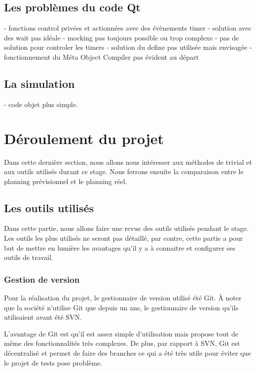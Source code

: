 \documentclass[a4paper]{article}
\begin{document}
\subsection{Les problèmes du code Qt}

- fonctions control privées et actionnées avec des évènements timer
- solution avec des wait pas idéale
- mocking pas toujours possible ou trop complexe
- pas de solution pour controler les timers
- solution du define pas utilisée mais envisagée
- fonctionnement du Méta Object Compiler pas évident au départ

\subsection{La simulation}

- code objet plus simple.
\section{Déroulement du projet}%

Dans cette dernière section, nous allons nous intéresser aux méthodes de
trivial et aux outils utilisés durant ce stage. Nous ferrons ensuite la
comparaison entre le planning prévisionnel et le planning réel.

\subsection{Les outils utilisés}%

Dans cette partie, nous allons faire une revue des outils utilisés pendant le
stage. Les outils les plus utilisés ne seront pas détaillé, par contre, cette
partie a pour but de mettre en lumière les avantages qu'il y a à connaitre et
configurer ses outils de travail.

\subsubsection{Gestion de version}%

Pour la réalisation du projet, le gestionnaire de version utilisé été Git. À
noter que la société n'utilise Git que depuis un ans, le gestionnaire de version
qu'ils utilisaient avant été SVN.

L'avantage de Git est qu'il est assez simple d'utilisation mais propose tout de
même des fonctionnalités très complexes. De plus, par rapport à SVN, Git est
décentralisé et permet de faire des branches ce qui a été très utile pour éviter
que le projet de tests pose problème.
\end{document}
